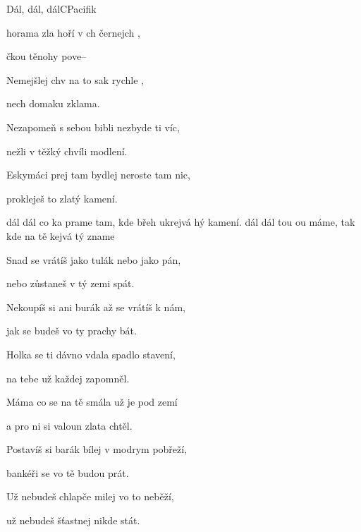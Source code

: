 \begin{song}{Dál, dál, dál}{C}{Pacifik}
  \begin{SBVerse}
 horama zla hoří v ch černejch ,

čkou těnohy pove--

Nemejšlej chv na to sak rychle ,

nech domaku zklama.
\end{SBVerse}
\begin{SBVerse}
Nezapomeň s sebou bibli nezbyde ti víc,

nežli v těžký chvíli modlení.

Eskymáci prej tam bydlej neroste tam nic,

prokleješ to zlatý kamení.

  \end{SBVerse}

\begin{SBChorus}
 dál dál co ka prame
tam, kde břeh ukrejvá hý kamení.
 dál dál tou ou máme,
tak kde na tě kejvá tý zname
\end{SBChorus}

\begin{SBVerse}
Snad se vrátíš jako tulák nebo jako pán,

nebo zůstaneš v tý zemi spát.

Nekoupíš si ani burák až se vrátíš k nám,

jak se budeš vo ty prachy bát.
\end{SBVerse}
\begin{SBVerse}
Holka se ti dávno vdala spadlo stavení,

na tebe už každej zapomněl.

Máma co se na tě smála už je pod zemí 

a pro ni si valoun zlata chtěl.
\end{SBVerse}

\begin{SBChorus}
\end{SBChorus}

\begin{SBVerse}
Postavíš si barák bílej v modrym pobřeží,

bankéři se vo tě budou prát.

Už nebudeš chlapče milej vo to neběží,

už nebudeš šťastnej nikde stát.
\end{SBVerse}

\begin{SBChorus}
\end{SBChorus}
\end{song}
